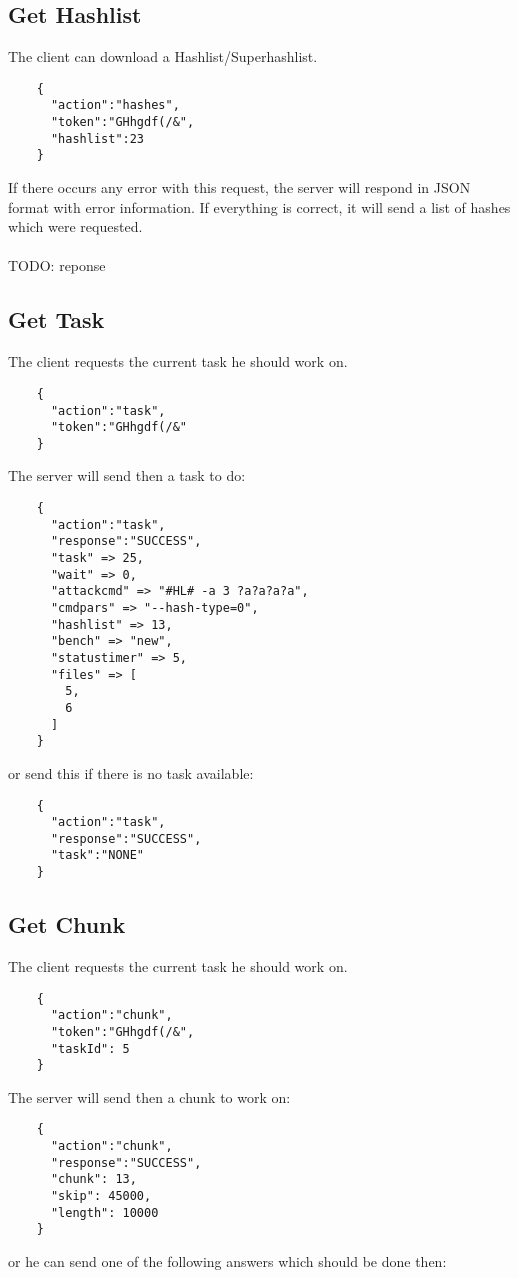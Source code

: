 \documentclass{article}
\begin{document}
	\subsection*{Get Hashlist}
	The client can download a Hashlist/Superhashlist.
	\begin{verbatim}
	{
	  "action":"hashes",
	  "token":"GHhgdf(/&",
	  "hashlist":23
	}
	\end{verbatim}
	If there occurs any error with this request, the server will respond in JSON format with error information. If everything is correct, it will send a list of hashes which were requested.\\\\
	TODO: reponse
	
	\subsection*{Get Task}
	The client requests the current task he should work on.
	\begin{verbatim}
	{
	  "action":"task",
	  "token":"GHhgdf(/&"
	}
	\end{verbatim}
	The server will send then a task to do:
	\begin{verbatim}
	{
	  "action":"task",
	  "response":"SUCCESS",
	  "task" => 25,
	  "wait" => 0,
	  "attackcmd" => "#HL# -a 3 ?a?a?a?a",
	  "cmdpars" => "--hash-type=0",
	  "hashlist" => 13,
	  "bench" => "new",
	  "statustimer" => 5,
	  "files" => [
	    5,
	    6
	  ]
	}
	\end{verbatim}
	or send this if there is no task available:
	\begin{verbatim}
	{
	  "action":"task",
	  "response":"SUCCESS",
	  "task":"NONE"
	}
	\end{verbatim}
	
	\subsection*{Get Chunk}
	The client requests the current task he should work on.
	\begin{verbatim}
	{
	  "action":"chunk",
   	  "token":"GHhgdf(/&",
	  "taskId": 5
	}
	\end{verbatim}
	The server will send then a chunk to work on:
	\begin{verbatim}
	{
	  "action":"chunk",
	  "response":"SUCCESS",
	  "chunk": 13,
	  "skip": 45000,
	  "length": 10000
	}
	\end{verbatim}
	or he can send one of the following answers which should be done then:
	
\end{document}
